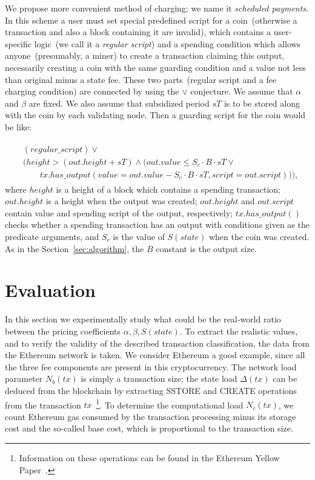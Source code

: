 \documentclass[]{llncs}   %
\begin{document}
We propose more convenient method of charging; we name it {\em scheduled payments}. In this scheme a user must set special predefined script for a coin~(otherwise a transaction and also a block containing it are invalid), which contains a user-specific logic~(we call it a {\em regular script}) and a spending condition which allows anyone~(presumably, a miner) to create a transaction claiming this output, necessarily creating a coin with the same guarding condition and a value not less than original minus a state fee. These two parts~(regular script and a fee charging condition) are connected by using the $\lor$ conjecture. We assume that $\alpha$ and $\beta$ are fixed. We also assume that subsidized period $sT$ is to be stored along with the coin by each validating node. Then a guarding script for the coin would be like:

\begin{align}
\begin{split}
&(regular\_script) \lor \\
&(height > (out.height + sT) \land (out.value \le S_c \cdot B \cdot sT \lor \\  
&\qquad tx.has\_output(value = out.value - S_c \cdot B \cdot sT, script = out.script))),
\end{split}
\end{align}
where $height$ is a height of a block which contains a spending transaction; $out.height$ is a height when the output was created; $out.height$ and $out.script$ contain value and spending script of the output, respectively; $tx.has\_output()$ checks whether a spending transaction has an output with conditions given as the predicate arguments, and $S_c$ is the value of $S(state)$ when the coin was created. As in the Section~\ref{sec:algorithm}, the $B$ constant is the output size.


\section{Evaluation}
\label{sec:evaluation}

In this section we experimentally study what could be the real-world
ratio between the pricing coefficients $\alpha, \beta, S(state)$. To extract the realistic 
values, and to verify the validity of the described transaction classification, the
data from the Ethereum network is taken. We consider Ethereum a good example,
since all the three fee components are present in this cryptocurrency. The network load parameter $N_b(tx)$ is simply a transaction size; the state
load $\Delta(tx)$ can be deduced from the blockchain by extracting SSTORE
and CREATE operations from the transaction $tx$~\footnote{Information on these operations can be found in the Ethereum Yellow Paper~\cite{ethyp}.}. To determine the
computational load $N_c(tx)$, we count Ethereum gas consumed by the transaction processing minus its storage cost and the so-called base cost, which is proportional to the transaction size.
\end{document}
